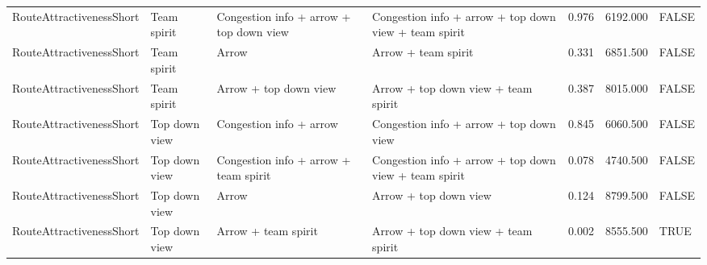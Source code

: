 \begin{tabular}{llllrrl}
  RouteAttractivenessShort & Team spirit & Congestion info + arrow + top down view & Congestion info + arrow + top down view + team spirit & 0.976 & 6192.000 & FALSE \\ 
  RouteAttractivenessShort & Team spirit & Arrow & Arrow + team spirit & 0.331 & 6851.500 & FALSE \\ 
  RouteAttractivenessShort & Team spirit & Arrow + top down view & Arrow + top down view + team spirit & 0.387 & 8015.000 & FALSE \\ 
  RouteAttractivenessShort & Top down view & Congestion info + arrow & Congestion info + arrow + top down view & 0.845 & 6060.500 & FALSE \\ 
  RouteAttractivenessShort & Top down view & Congestion info + arrow + team spirit & Congestion info + arrow + top down view + team spirit & 0.078 & 4740.500 & FALSE \\ 
  RouteAttractivenessShort & Top down view & Arrow & Arrow + top down view & 0.124 & 8799.500 & FALSE \\ 
  RouteAttractivenessShort & Top down view & Arrow + team spirit & Arrow + top down view + team spirit & 0.002 & 8555.500 & TRUE \\ 
   \hline
\end{tabular}
